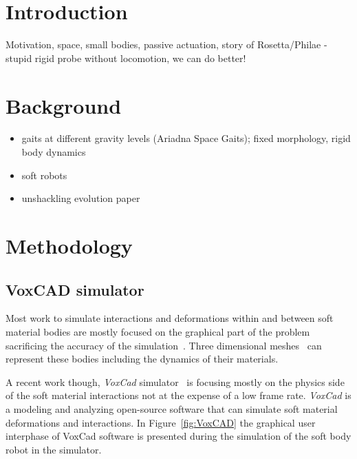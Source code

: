 \documentclass{sig-alternate}
\begin{document}



\section{Introduction}
Motivation, space, small bodies, passive actuation, story of Rosetta/Philae - stupid rigid probe without locomotion, we can do better!

\section{Background}
\begin{itemize}
\item gaits at different gravity levels (Ariadna Space Gaits); fixed morphology, rigid body dynamics
\item soft robots
\item unshackling evolution paper
\end{itemize}

\section{Methodology}
\subsection{VoxCAD simulator}

Most work to simulate interactions and deformations within and between soft material bodies are mostly focused on the graphical part of the problem~\cite{faloutsos1997dynamic} sacrificing the accuracy of the simulation~\cite{teschner2004versatile}. Three dimensional meshes~\cite{muller2002stable} can represent these bodies including the dynamics of their materials. 

A recent work though, \emph{VoxCad} simulator~\cite{hiller2012dynamic} is focusing mostly on the physics side of the soft material interactions not at the expense of a low frame rate. \emph{VoxCad} is a modeling and analyzing open-source software that can simulate soft material deformations and interactions. In Figure~\ref{fig:VoxCAD} the graphical user interphase of VoxCad software is presented during the simulation of the soft body robot in the simulator.
\end{document}
